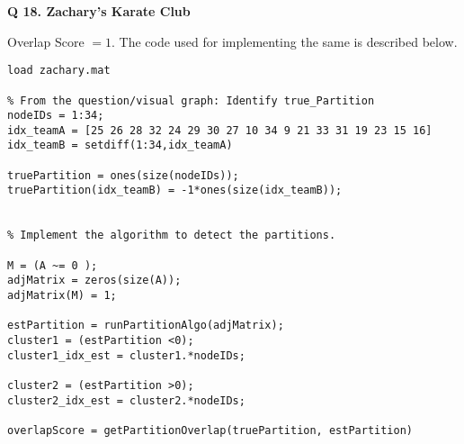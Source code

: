 \documentclass[9pt]{article}
\begin{document}
\hrulefill



\textbf{Q 18. Zachary's Karate Club}

Overlap Score $= 1$. The code used for implementing the same is described below.
\begin{lstlisting}
load zachary.mat

% From the question/visual graph: Identify true_Partition
nodeIDs = 1:34;
idx_teamA = [25 26 28 32 24 29 30 27 10 34 9 21 33 31 19 23 15 16]
idx_teamB = setdiff(1:34,idx_teamA)

truePartition = ones(size(nodeIDs));
truePartition(idx_teamB) = -1*ones(size(idx_teamB));


% Implement the algorithm to detect the partitions.

M = (A ~= 0 );
adjMatrix = zeros(size(A));
adjMatrix(M) = 1;

estPartition = runPartitionAlgo(adjMatrix);
cluster1 = (estPartition <0);
cluster1_idx_est = cluster1.*nodeIDs;

cluster2 = (estPartition >0);
cluster2_idx_est = cluster2.*nodeIDs;

overlapScore = getPartitionOverlap(truePartition, estPartition)

\end{lstlisting}

\hrulefill
\end{document}
